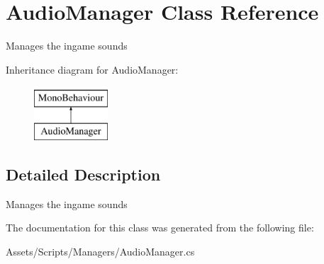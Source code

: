 \hypertarget{class_audio_manager}{}\section{Audio\+Manager Class Reference}
\label{class_audio_manager}


Manages the ingame sounds  


Inheritance diagram for Audio\+Manager\+:\begin{figure}[H]
\begin{center}
\leavevmode
\includegraphics[height=2.000000cm]{class_audio_manager}
\end{center}
\end{figure}


\subsection{Detailed Description}
Manages the ingame sounds 



The documentation for this class was generated from the following file\+:\begin{DoxyCompactItemize}
\item 
Assets/\+Scripts/\+Managers/Audio\+Manager.\+cs\end{DoxyCompactItemize}
